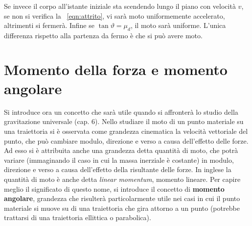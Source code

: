 Se invece il corpo all'istante iniziale sta scendendo lungo il piano con velocità $v$, se non si verifica la ~\eqref{eqn:attrito}, vi sarà moto uniformemente accelerato, altrimenti si fermerà. Infine se $\tan\vartheta=\mu_d$, il moto sarà uniforme. L'unica differenza rispetto alla partenza da fermo è che si può avere moto.

\section{Momento della forza e momento angolare}

Si introduce ora un concetto che sarà utile quando si affronterà lo studio della gravitazione universale (cap. 6). Nello studiare il moto di un punto materiale su una traiettoria si è osservata come grandezza cinematica la velocità vettoriale del punto, che può cambiare modulo, direzione e verso a causa dell'effetto delle forze. Ad esso si è attribuita anche una grandezza detta quantità di moto, che potrà variare (immaginando il caso in cui la massa inerziale è costante) in modulo, direzione e verso a causa dell'effetto della risultante delle forze. In inglese la quantità di moto è anche detta \textit{linear momentum}, momento lineare. Per capire meglio il significato di questo nome, si introduce il concetto di \textbf{momento angolare}, grandezza che risulterà particolarmente utile nei casi in cui il punto materiale si muove su di una traiettoria che gira attorno a un punto (potrebbe trattarsi di una traiettoria ellittica o parabolica).

